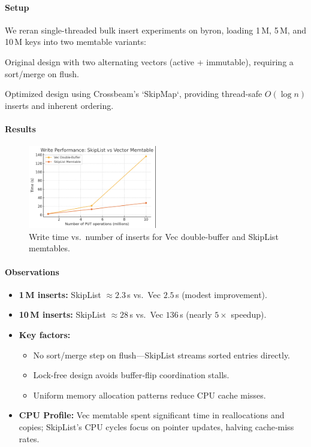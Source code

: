 \documentclass[10pt]{article}
\begin{document}
\paragraph{Setup}
We reran single-threaded bulk insert experiments on byron, loading 1\,M, 5\,M, and 10\,M keys into two memtable variants:
\begin{description}[leftmargin=1em,labelwidth=*,itemsep=0.5ex]
  \item[Vec Double-Buffer] Original design with two alternating vectors (active + immutable), requiring a sort/merge on flush.
  \item[Lock-Free SkipList] Optimized design using Crossbeam’s `SkipMap`, providing thread-safe $O(\log n)$ inserts and inherent ordering.
\end{description}

\paragraph{Results}
\begin{figure}[htbp]
  \centering
  \includegraphics[width=0.5\textwidth]{skiplist_v_memtable.png}
  \caption{Write time vs.\ number of inserts for Vec double-buffer and SkipList memtables.}
  \label{fig:memtable_comparison}
\end{figure}

\paragraph{Observations}
\begin{itemize}[itemsep=0.5ex]
  \item \textbf{1\,M inserts:} SkipList $\approx2.3\,$s vs.\ Vec $2.5\,$s (modest improvement).
  \item \textbf{10\,M inserts:} SkipList $\approx28\,$s vs.\ Vec $136\,$s (nearly $5\times$ speedup).
  \item \textbf{Key factors:}
    \begin{itemize}[itemsep=0.3ex]
      \item No sort/merge step on flush—SkipList streams sorted entries directly.
      \item Lock-free design avoids buffer‐flip coordination stalls.
      \item Uniform memory allocation patterns reduce CPU cache misses.
    \end{itemize}
  \item \textbf{CPU Profile:} Vec memtable spent significant time in reallocations and copies; SkipList’s CPU cycles focus on pointer updates, halving cache‐miss rates.
\end{itemize}
\end{document}
